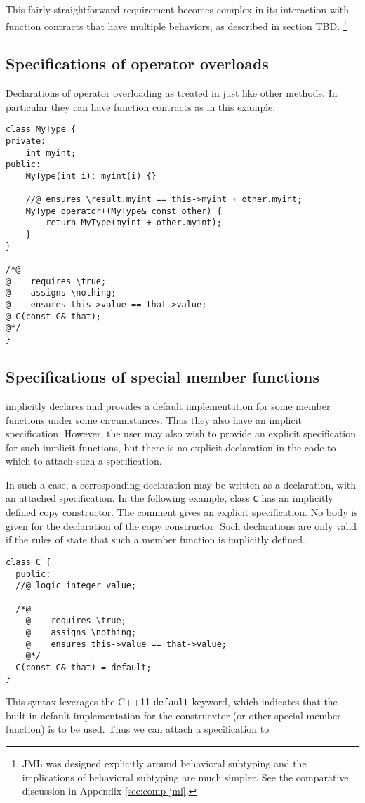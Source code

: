 This fairly straightforward requirement becomes complex in its interaction with function contracts that have multiple behaviors, 
as described in section TBD.
\footnote{JML was designed explicitly around behavioral subtyping and the implications of behavioral subtyping are much simpler. 
	See the comparative discussion in Appendix \ref{sec:comp-jml}.}


\subsection{Specifications of operator overloads}
Declarations of operator overloading as treated in \NAME{} just like other
methods. In particular they can have function contracts as in this example:
\begin{lstlisting}
class MyType {
private:
    int myint;
public:
    MyType(int i): myint(i) {}

    //@ ensures \result.myint == this->myint + other.myint;
    MyType operator+(MyType& const other) {
        return MyType(myint + other.myint);
    }
}

/*@
@    requires \true;
@    assigns \nothing;
@    ensures this->value == that->value;
@ C(const C& that);
@*/
}
\end{lstlisting}
\subsection{Specifications of special member functions}

\lang{} implicitly declares and provides a default implementation for some member functions under some circumstances. 
Thus they also have an implicit specification. However, the user may also wish to provide an explicit specification for such implicit functions, but there is no
explicit declaration in the \lang{} code to which to attach such a 
specification.

In such a case, a corresponding declaration may be written as a \NAME{} 
declaration, with an attached specification. 
In the following example, class \lstinline|C| has an implicitly defined
copy constructor. The \NAME{} comment gives an explicit specification.
No body is given for the declaration of the \lang{} copy constructor.
Such declarations are only valid if the rules of \lang{} state that such
a member function is implicitly defined.
\begin{lstlisting}
class C {
  public:
  //@ logic integer value;
  
  /*@
    @    requires \true;
    @    assigns \nothing;
    @    ensures this->value == that->value;
    @*/
  C(const C& that) = default;
}
\end{lstlisting}
This syntax leverages the C++11 \lstinline|default| keyword, which indicates that the built-in default implementation for the construcxtor (or other special member function) is to be used. Thus we can attach a specification to 

